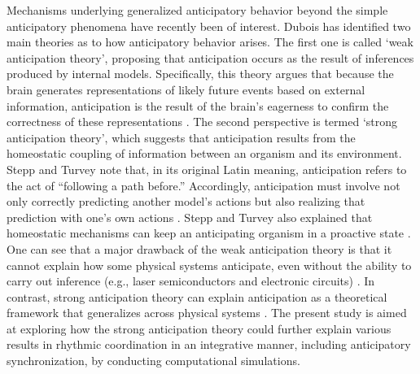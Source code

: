 \documentclass{report}
\begin{document}
Mechanisms underlying generalized anticipatory behavior beyond the simple anticipatory phenomena have recently been of interest. Dubois \cite{dubois2001incursive} has identified two main theories as to how anticipatory behavior arises. The first one is called ‘weak anticipation theory’, proposing that anticipation occurs as the result of inferences produced by internal models. Specifically, this theory argues that because the brain generates representations of likely future events based on external information, anticipation is the result of the brain’s eagerness to confirm the correctness of these representations \cite{clark1998being, clark1999towards}. The second perspective is termed ‘strong anticipation theory’, which suggests that anticipation results from the homeostatic coupling of information between an organism and its environment. Stepp and Turvey \cite{stepp2010strong} note that, in its original Latin meaning, anticipation refers to the act of “following a path before.” Accordingly, anticipation must involve not only correctly predicting another model’s actions but also realizing that prediction with one’s own actions \cite{stepp2010strong}. Stepp and Turvey also explained that homeostatic mechanisms can keep an anticipating organism in a proactive state \cite{stepp2010strong}. One can see that a major drawback of the weak anticipation theory is that it cannot explain how some physical systems anticipate, even without the ability to carry out inference (e.g., laser semiconductors and electronic circuits) \cite{washburn2015harmony, kelso1995dynamic}. In contrast, strong anticipation theory can explain anticipation as a theoretical framework that generalizes across physical systems \cite{stepp2010strong}. The present study is aimed at exploring how the strong anticipation theory could further explain various results in rhythmic coordination in an integrative manner, including anticipatory synchronization, by conducting computational simulations.
\end{document}

